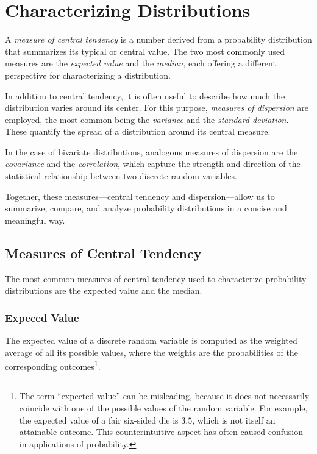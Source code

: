 %
%

\section{Characterizing Distributions}
\label{sec:probability_expectation}

A \emph{measure of central tendency} is a number derived from a probability distribution that summarizes its typical or central value. The two most commonly used measures are the \emph{expected value} and the \emph{median}, each offering a different perspective for characterizing a distribution.

In addition to central tendency, it is often useful to describe how much the distribution varies around its center. For this purpose, \emph{measures of dispersion} are employed, the most common being the \emph{variance} and the \emph{standard deviation}. These quantify the spread of a distribution around its central measure.

In the case of bivariate distributions, analogous measures of dispersion are the \emph{covariance} and the \emph{correlation}, which capture the strength and direction of the statistical relationship between two discrete random variables.

Together, these measures—central tendency and dispersion—allow us to summarize, compare, and analyze probability distributions in a concise and meaningful way.

%
%

\subsection{Measures of Central Tendency}

The most common measures of central tendency used to characterize probability distributions are the expected value and the median.


\subsubsection*{Expeced Value}

The expected value of a discrete random variable is computed as the weighted average of all its possible values, where the weights are the probabilities of the corresponding outcomes\footnote{The term “expected value” can be misleading, because it does not necessarily coincide with one of the possible values of the random variable. For example, the expected value of a fair six-sided die is $3.5$, which is not itself an attainable outcome. This counterintuitive aspect has often caused confusion in applications of probability.}.

